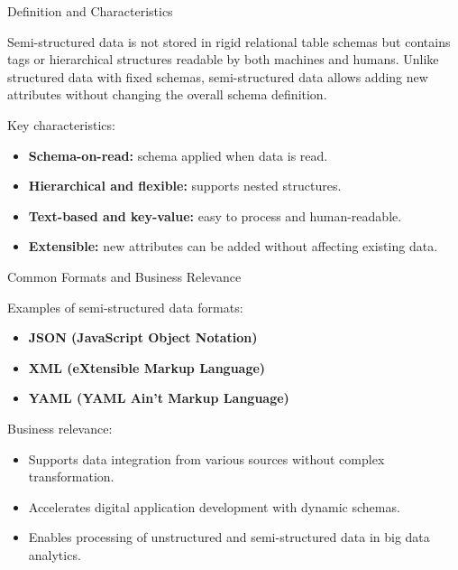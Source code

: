 \documentclass[aspectratio=169, table]{beamer}
\begin{document}
\begin{frame}{Definition and Characteristics}
	\vspace{20pt}
	
	Semi-structured data is not stored in rigid relational table schemas but contains tags or hierarchical structures readable by both machines and humans. Unlike structured data with fixed schemas, semi-structured data allows adding new attributes without changing the overall schema definition.
	
	\vspace{10pt}
	Key characteristics:
	\begin{itemize}
		\item \textbf{Schema-on-read:} schema applied when data is read.
		\item \textbf{Hierarchical and flexible:} supports nested structures.
		\item \textbf{Text-based and key-value:} easy to process and human-readable.
		\item \textbf{Extensible:} new attributes can be added without affecting existing data.
	\end{itemize}
	
\end{frame}

\begin{frame}{Common Formats and Business Relevance}
	\vspace{20pt}
	
	Examples of semi-structured data formats:
	\begin{itemize}
		\item \textbf{JSON (JavaScript Object Notation)}
		\item \textbf{XML (eXtensible Markup Language)}
		\item \textbf{YAML (YAML Ain't Markup Language)}
	\end{itemize}
	
	\vspace{10pt}
	Business relevance:
	\begin{itemize}
		\item Supports data integration from various sources without complex transformation.
		\item Accelerates digital application development with dynamic schemas.
		\item Enables processing of unstructured and semi-structured data in big data analytics.
	\end{itemize}
	
\end{frame}
\end{document}

